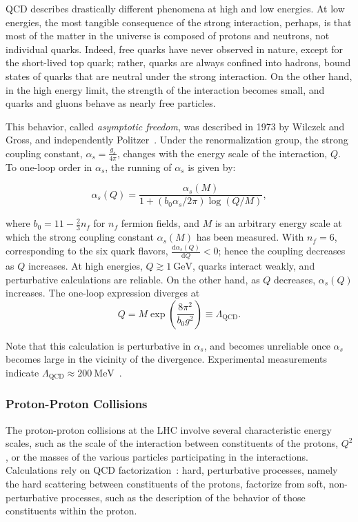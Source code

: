 QCD describes drastically different phenomena at high and low energies. At low energies, the most tangible consequence of the strong interaction, perhaps, is that most of the matter in the universe is composed of protons and neutrons, not individual quarks. Indeed, free quarks have never observed in nature, except for the short-lived top quark; rather, quarks are always confined into hadrons, bound states of quarks that are neutral under the strong interaction. On the other hand, in the high energy limit, the strength of the interaction becomes small, and quarks and gluons behave as nearly free particles.

This behavior, called \emph{asymptotic freedom}, was described in 1973 by Wilczek and Gross, and independently Politzer~\cite{Gross:1973id,Politzer:1973fx}. Under the renormalization group, the strong coupling constant, $\alpha_s = \frac{g_s}{4\pi}$, changes with the energy scale of the interaction, $Q$. To one-loop order in $\alpha_s$, the running of $\alpha_s$ is given by:

\begin{equation}
\alpha_s(Q) = \frac{\alpha_s(M)}{1 + (b_0 \alpha_s/2\pi)\log(Q/M)},
\end{equation}

where $b_0=11-\frac{2}{3}n_f$ for $n_f$ fermion fields, and $M$ is an arbitrary energy scale at which the strong coupling constant $\alpha_s(M)$ has been measured. With $n_f=6$, corresponding to the six quark flavors, $\frac{\mathrm{d}\alpha_s(Q)}{\mathrm{d}Q}<0$; hence the coupling decreases as $Q$ increases. At high energies, $Q\gtrsim \SI{1}{\giga\electronvolt}$, quarks interact weakly, and perturbative calculations are reliable. On the other hand, as $Q$ decreases, $\alpha_s(Q)$ increases. The one-loop expression diverges at
\begin{equation}
Q=M\exp\left(\frac{8\pi^2}{b_0g^2}\right) \equiv \Lambda_{\mathrm{QCD}}.
\end{equation}

Note that this calculation is perturbative in $\alpha_s$, and becomes unreliable once $\alpha_s$ becomes large in the vicinity of the divergence. Experimental measurements indicate $\Lambda_{\mathrm{QCD}}\approx \SI{200}{\mega\electronvolt}$~\cite{Campbell:1998gr}. 


\subsubsection{Proton-Proton Collisions}
The proton-proton collisions at the LHC involve several characteristic energy scales, such as the scale of the interaction between constituents of the protons, $Q^2$, or the masses of the various particles participating in the interactions. Calculations rely on QCD factorization~\cite{Collins:2004tz}: hard, perturbative processes, namely the hard scattering between constituents of the protons, factorize from soft, non-perturbative processes, such as the description of the behavior of those constituents within the proton. 


